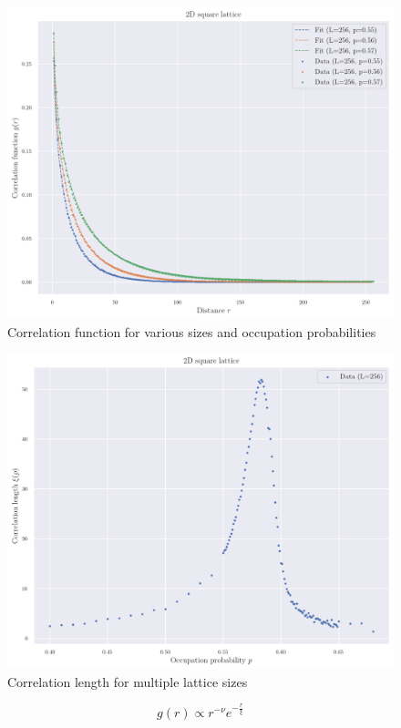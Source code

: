 \begin{figure}[H]
  \includegraphics[width=\linewidth]{Images/sec3_corr_func_1.png}
  \caption{Correlation function for various sizes and occupation probabilities}
  \label{fig:sec3_corr_func_1}
\end{figure}


\begin{figure}[H]
  \includegraphics[width=\linewidth]{Images/sec3_corr_length_1.png}
  \caption{Correlation length for multiple lattice sizes}
  \label{fig:sec3_corr_length_1}
\end{figure}





$$ 
 g(r) \propto r^{-\nu} e^{-\frac{r}{\xi}}
$$ 

\clearpage
